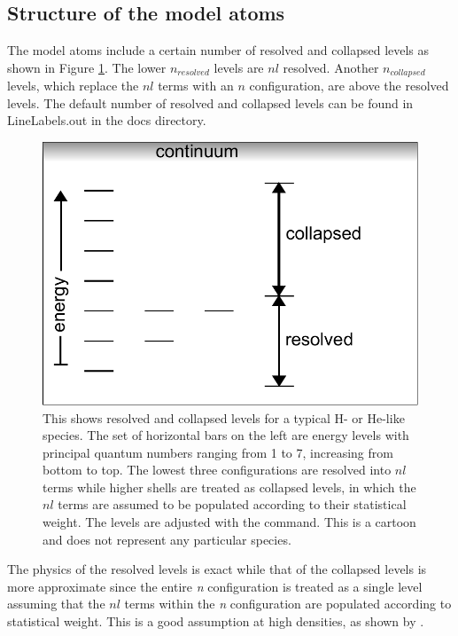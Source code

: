 \subsection{Structure of the model atoms}

The model atoms include a certain number of resolved and collapsed levels
as shown in Figure \ref{fig:LevelsResolvedCollapsed}.
The lower $n_{resolved}$ levels are $nl$ resolved.
Another $n_{collapsed}$ levels,
which replace the $nl$ terms with an $n$ configuration,
are above the resolved levels.
The default number of resolved and collapsed levels can be found in
LineLabels.out in the docs directory.

\begin{figure}
\centering
\includegraphics[scale=0.7]{LevelsResolvedCollapsed}
\caption[Resolved and collapsed levels]
{\label{fig:LevelsResolvedCollapsed}This shows  
resolved and collapsed levels for a typical H- or He-like species.
The set of horizontal bars on the left are energy levels with
principal quantum numbers ranging from 1 to 7, increasing from bottom to top.
The lowest three configurations are resolved into $nl$ terms while
higher shells are treated as collapsed levels, in which the $nl$ terms
are assumed to be populated according to their statistical weight.
The levels are adjusted with the  command.
This is a cartoon and does not represent any particular species.}
\end{figure}

The physics of the resolved levels is exact while that of the
collapsed levels is more approximate since the entire \emph{n} configuration is
treated as a single level assuming that the $nl$ terms within the \emph{n} configuration 
are populated according to statistical weight.
This is a good assumption at high densities, as
shown by \citet{PengellySeaton1964}.

